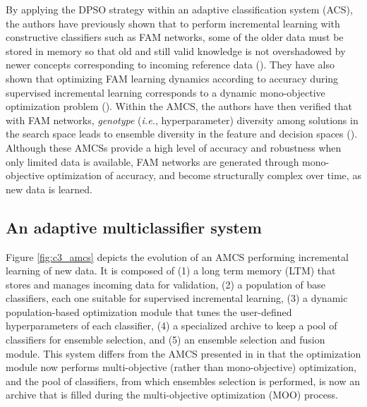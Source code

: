 By applying the DPSO strategy within an adaptive classification system (ACS), the authors have previously shown that to perform incremental learning with constructive classifiers such as FAM networks, some of the older data must be stored in memory so that old and still valid knowledge is not overshadowed by newer concepts corresponding to incoming reference data (\cite{connolly10}).
They have also shown that optimizing FAM learning dynamics according to accuracy during supervised incremental learning corresponds to a dynamic mono-objective optimization problem (\cite{connolly10}).
Within the AMCS, the authors have then verified that with FAM networks, \emph{genotype} (\emph{i.e.}, hyperparameter) diversity among solutions in the search space leads to ensemble diversity in the feature and decision spaces (\cite{connolly11}).
Although these AMCSs provide a high level of accuracy and robustness when only limited data is available, FAM networks are generated through mono-objective optimization of accuracy, and become structurally complex over time, as new data is learned.

\subsection{An adaptive multiclassifier system}
\label{sec:c3_AMCS}

Figure \ref{fig:c3_amcs} depicts the evolution of an AMCS performing incremental learning of new data.
It is composed of (1) a long term memory (LTM) that stores and manages incoming data for validation, (2) a population of base classifiers, each one suitable for supervised incremental learning, (3) a dynamic population-based optimization module that tunes the user-defined hyperparameters of each classifier, (4) a specialized archive to keep a pool of classifiers for ensemble selection, and (5) an ensemble selection and fusion module.
This system differs from the AMCS presented in \cite{connolly11} in that the optimization module now performs multi-objective (rather than mono-objective) optimization, and the pool of classifiers, from which ensembles selection is performed, is now an archive that is filled during the multi-objective optimization (MOO) process.

